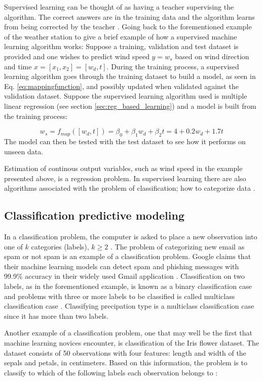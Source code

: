 	Supervised learning can be thought of as having a teacher supervising the algorithm. The correct answers are in the training data and the algorithm learns from being corrected by the teacher \cite{WEBSITE:3}. Going back to the forementioned example of the weather station to give a brief example of how a supervised machine learning algorithm works: Suppose a training, validation and test dataset is provided and one wishes to predict wind speed $y = w_s$ based on wind direction and time $x = [x_1, x_2] = [w_d, t]$. During the training process, a supervised learning algorithm goes through the training dataset to build a model, as seen in Eq. \ref{eq:mappingfunction}, and possibly updated when validated against the validation dataset. Suppose the supervised learning algorithm used is multiple linear regression (see section \ref{sec:reg_based_learning}) and a model is built from the training process: 

\begin{equation} \label{eq:example_ws}
	w_s = f_{map}([w_d, t]) = \beta_0 + \beta_1 w_d + \beta_2 t = 4 + 0.2w_d + 1.7t
\end{equation}
	The model can then be tested with the test dataset to see how it performs on unseen data. 

	Estimation of continous output variables, such as wind speed in the example presented above, is a regression problem. In supervised learning there are also algorithms associated with the problem of classification; how to categorize data \cite{WEBSITE:8}.


	\subsection{Classification predictive modeling} \label{sec:classification}
	In a classification problem, the computer is asked to place a new observation into one of $k$ categories (labels), $k \geq 2$ \cite{BOOK:1}. The problem of categorizing new email as spam or not spam is an example of a classification problem. Google claims that their machine learning models can detect spam and phishing messages with 99.9\% accuracy in their widely used Gmail application \cite{WEBSITE:4}. Classification on two labels, as in the forementioned example, is known as a binary classification case and problems with three or more labels to be classified is called multiclass classification case \cite{MISC:1}. Classifying precipation type is a multiclass classification case since it has more than two labels.

	Another example of a classification problem, one that may well be the first that machine learning novices encounter, is classification of the Iris flower dataset. The dataset consists of 50 observations with four features: length and width of the sepals and petals, in centimeters. Based on this information, the problem is to classify to which of the following labels each observation belongs to \cite{WEBSITE:5}:


